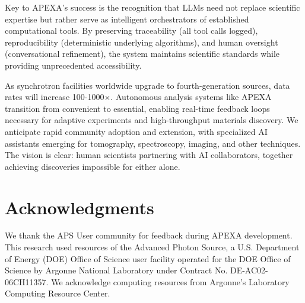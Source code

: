 \documentclass[11pt]{article}
\begin{document}
Key to APEXA's success is the recognition that LLMs need not replace scientific expertise but rather serve as intelligent orchestrators of established computational tools. By preserving traceability (all tool calls logged), reproducibility (deterministic underlying algorithms), and human oversight (conversational refinement), the system maintains scientific standards while providing unprecedented accessibility.

As synchrotron facilities worldwide upgrade to fourth-generation sources, data rates will increase 100-1000$\times$. Autonomous analysis systems like APEXA transition from convenient to essential, enabling real-time feedback loops necessary for adaptive experiments and high-throughput materials discovery. We anticipate rapid community adoption and extension, with specialized AI assistants emerging for tomography, spectroscopy, imaging, and other techniques. The vision is clear: human scientists partnering with AI collaborators, together achieving discoveries impossible for either alone.

\section*{Acknowledgments}

We thank the APS User community for feedback during APEXA development. This research used resources of the Advanced Photon Source, a U.S. Department of Energy (DOE) Office of Science user facility operated for the DOE Office of Science by Argonne National Laboratory under Contract No. DE-AC02-06CH11357. We acknowledge computing resources from Argonne's Laboratory Computing Resource Center.
\end{document}
